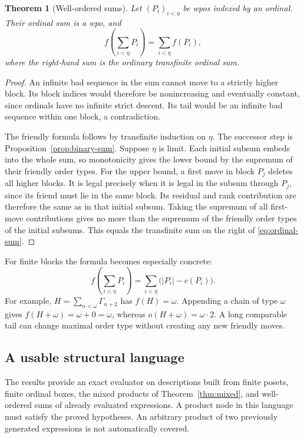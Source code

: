 \documentclass[11pt,letterpaper]{article}
\newtheorem{theorem}{Theorem}[section]
\theoremstyle{definition}
\theoremstyle{remark}
\newcommand{\anti}[1]{\Gamma_{#1}}
\begin{document}
\begin{theorem}[Well-ordered sums]\label{thm:ordinal-sum}
Let $(P_i)_{i<\eta}$ be wpos indexed by an ordinal. Their ordinal sum is a
wpo, and
\begin{equation}\label{eq:ordinal-sum}
 f\left(\sum_{i<\eta}P_i\right)=\sum_{i<\eta}f(P_i),
\end{equation}
where the right-hand sum is the ordinary transfinite ordinal sum.
\end{theorem}
\begin{proof}
An infinite bad sequence in the sum cannot move to a strictly higher
block. Its block indices would therefore be nonincreasing and eventually
constant, since ordinals have no infinite strict descent. Its tail would
be an infinite bad sequence within one block, a contradiction.

The friendly formula follows by transfinite induction on $\eta$.
The successor step is Proposition~\ref{prop:binary-sum}. Suppose $\eta$
is limit. Each initial subsum embeds into the whole sum, so monotonicity
gives the lower bound by the supremum of their friendly order types.
For the upper bound, a first move in block $P_j$ deletes all higher blocks.
It is legal precisely when it is legal in the subsum through $P_j$, since
its friend must lie in the same block. Its residual and rank contribution
are therefore the same as in that initial subsum. Taking the supremum
of all first-move contributions gives no more than the supremum of the
friendly order types of the initial subsums. This equals the transfinite
sum on the right of \eqref{eq:ordinal-sum}.
\end{proof}

For finite blocks the formula becomes especially concrete:
\[
 f\left(\sum_{i<\eta}P_i\right)
 =\sum_{i<\eta}\bigl(|P_i|-c(P_i)\bigr).
\]
For example, $H=\sum_{n<\omega}\anti{n+2}$ has $f(H)=\omega$.
Appending a chain of type $\omega$ gives
$f(H+\omega)=\omega+0=\omega$, whereas
$o(H+\omega)=\omega\cdot2$. A long comparable tail can change maximal
order type without creating any new friendly moves.

\subsection{A usable structural language}
The results provide an exact evaluator on descriptions built from finite
posets, finite ordinal boxes, the mixed products of
Theorem~\ref{thm:mixed}, and well-ordered sums of already evaluated
expressions. A product node in this language must satisfy the proved
hypotheses. An arbitrary product of two previously generated expressions
is not automatically covered.
\end{document}
